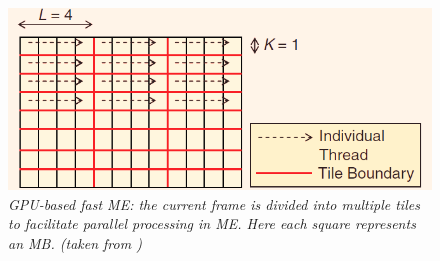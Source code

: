 \begin{figure}[H]
\centerline{\includegraphics[scale=0.35]{pics/tiling}} %
\caption{\label{tiling}{\it GPU-based fast ME: the current frame is divided into
multiple tiles to facilitate parallel processing in ME. Here each square represents an MB. (taken from \cite{Paper1})}}
\end{figure}
